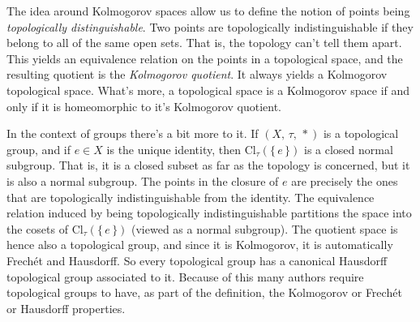 \documentclass{article}
\theoremstyle{plain}
\theoremstyle{normal}
\begin{document}
        The idea around Kolmogorov spaces allow us to define the notion of
        points being \textit{topologically distinguishable}. Two points are
        topologically indistinguishable if they belong to all of the same open
        sets. That is, the topology can't tell them apart. This yields an
        equivalence relation on the points in a topological space, and the
        resulting quotient is the \textit{Kolmogorov quotient}. It always yields
        a Kolmogorov topological space. What's more, a topological space is a
        Kolmogorov space if and only if it is homeomorphic to it's
        Kolmogorov quotient.
        \par\hfill\par
        In the context of groups there's a bit more to it. If $(X,\,\tau,\,*)$
        is a topological group, and if $e\in{X}$ is the unique identity, then
        $\textrm{Cl}_{\tau}(\{\,e\,\})$ is a closed normal subgroup. That is,
        it is a closed subset as far as the topology is concerned, but it is
        also a normal subgroup. The points in the closure of $e$ are precisely
        the ones that are topologically indistinguishable from the identity.
        The equivalence relation induced by being
        topologically indistinguishable
        partitions the space into the cosets of $\textrm{Cl}_{\tau}(\{\,e\,\})$
        (viewed as a normal subgroup). The quotient space is hence also a
        topological group, and since it is Kolmogorov, it is automatically
        Frech\'{e}t and Hausdorff. So every topological group has a canonical
        Hausdorff topological group associated to it. Because of this many
        authors require topological groups to have, as part of the definition,
        the Kolmogorov or Frech\'{e}t or Hausdorff properties.
\end{document}
